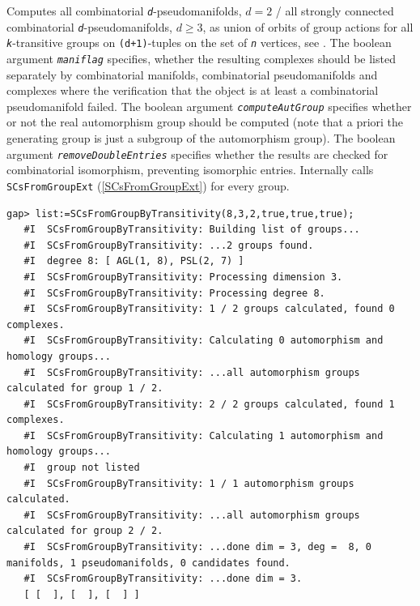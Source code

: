 \documentclass[a4paper,11pt]{report}
\begin{document}
{{{ Computes all combinatorial \mbox{\texttt{\mdseries\slshape d}}-pseudomanifolds, $d = 2$ / all strongly connected combinatorial \mbox{\texttt{\mdseries\slshape d}}-pseudomanifolds, $d \geq 3$, as union of orbits of group actions for all \mbox{\texttt{\mdseries\slshape k}}-transitive groups on \texttt{(d+1)}-tuples on the set of \mbox{\texttt{\mdseries\slshape n}} vertices, see \cite{Lutz03TrigMnfFewVertVertTrans}. The boolean argument \mbox{\texttt{\mdseries\slshape maniflag}} specifies, whether the resulting complexes should be listed separately by
combinatorial manifolds, combinatorial pseudomanifolds and complexes where the
verification that the object is at least a combinatorial pseudomanifold
failed. The boolean argument \mbox{\texttt{\mdseries\slshape computeAutGroup}} specifies whether or not the real automorphism group should be computed (note
that a priori the generating group is just a subgroup of the automorphism
group). The boolean argument \mbox{\texttt{\mdseries\slshape removeDoubleEntries}} specifies whether the results are checked for combinatorial isomorphism,
preventing isomorphic entries. Internally calls \texttt{SCsFromGroupExt} (\ref{SCsFromGroupExt}) for every group. 
\begin{Verbatim}[commandchars=!@|,fontsize=\small,frame=single,label=Example]
   gap> list:=SCsFromGroupByTransitivity(8,3,2,true,true,true);
   #I  SCsFromGroupByTransitivity: Building list of groups...
   #I  SCsFromGroupByTransitivity: ...2 groups found.
   #I  degree 8: [ AGL(1, 8), PSL(2, 7) ]
   #I  SCsFromGroupByTransitivity: Processing dimension 3.
   #I  SCsFromGroupByTransitivity: Processing degree 8.
   #I  SCsFromGroupByTransitivity: 1 / 2 groups calculated, found 0 complexes.
   #I  SCsFromGroupByTransitivity: Calculating 0 automorphism and homology groups...
   #I  SCsFromGroupByTransitivity: ...all automorphism groups calculated for group 1 / 2.
   #I  SCsFromGroupByTransitivity: 2 / 2 groups calculated, found 1 complexes.
   #I  SCsFromGroupByTransitivity: Calculating 1 automorphism and homology groups...
   #I  group not listed
   #I  SCsFromGroupByTransitivity: 1 / 1 automorphism groups calculated.
   #I  SCsFromGroupByTransitivity: ...all automorphism groups calculated for group 2 / 2.
   #I  SCsFromGroupByTransitivity: ...done dim = 3, deg =  8, 0 manifolds, 1 pseudomanifolds, 0 candidates found.
   #I  SCsFromGroupByTransitivity: ...done dim = 3.
   [ [  ], [  ], [  ] ]
   
\end{Verbatim}
 }

}}
\end{document}
